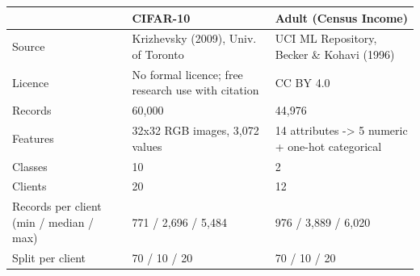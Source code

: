 \begin{tabular}{p{2.3cm}p{2.6cm}p{2.6cm}}
\toprule
 & CIFAR-10 & Adult (Census Income) \\
\midrule
Source & Krizhevsky (2009), Univ. of Toronto & UCI ML Repository, Becker \& Kohavi (1996) \\
Licence & No formal licence; free research use with citation & CC BY 4.0 \\
Records & 60,000 & 44,976 \\
Features & 32x32 RGB images, 3,072 values & 14 attributes -> 5 numeric + one-hot categorical \\
Classes & 10 & 2 \\
Clients & 20 & 12 \\
Records per client (min / median / max) & 771 / 2,696 / 5,484 & 976 / 3,889 / 6,020 \\
Split per client & 70 / 10 / 20 & 70 / 10 / 20 \\
\bottomrule
\end{tabular}
